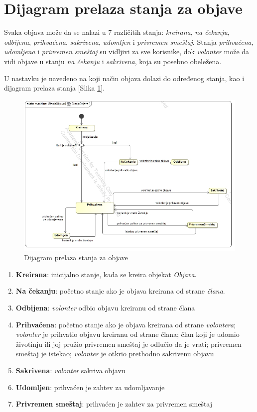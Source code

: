 \section{Dijagram prelaza stanja za objave}
\par Svaka objava može da se nalazi u 7 različitih stanja: \textit{kreirana}, \textit{na čekanju}, \textit{odbijena},
\textit{prihvaćena}, \textit{sakrivena}, \textit{udomljen} i \textit{privremen smeštaj}. 
Stanja \textit{prihvaćena}, \textit{udomljena} i \textit{privremen smeštaj} su vidljivi za sve korisnike,
dok \textit{volonter} može da vidi objave u stanju \textit{na čekanju} i \textit{sakrivena}, koja su posebno obeležena.
\par U nastavku je navedeno na koji način objava dolazi do određenog stanja, kao i dijagram prelaza stanja [Slika \ref{fig:state}].
\begin{figure}[h]
    \centering
    \includegraphics[width=\textwidth]{img/state.jpg}
    \caption{Dijagram prelaza stanja za objave}
    \label{fig:state}
\end{figure}
\begin{enumerate}
    \item \textbf{Kreirana}: inicijalno stanje, kada se kreira objekat \textit{Objava}.
    \item \textbf{Na čekanju}: početno stanje ako je objava kreirana od strane \textit{člana}.
    \item \textbf{Odbijena}: \textit{volonter} odbio objavu kreiranu od strane člana
    \item \textbf{Prihvaćena}: 
        početno stanje ako je objava kreirana od strane \textit{volontera}; 
        \textit{volonter} je prihvatio objavu kreiranu od strane člana;
        član koji je udomio životinju ili joj pružio privremen smeštaj je odlučio da je vrati;
        privremen smeštaj je istekao;
        \textit{volonter} je otkrio prethodno sakrivenu objavu
    \item \textbf{Sakrivena}: \textit{volonter} sakriva objavu
    \item \textbf{Udomljen}: prihvaćen je zahtev za udomljavanje
    \item \textbf{Privremen smeštaj}: prihvaćen je zahtev za privremen smeštaj
\end{enumerate}
